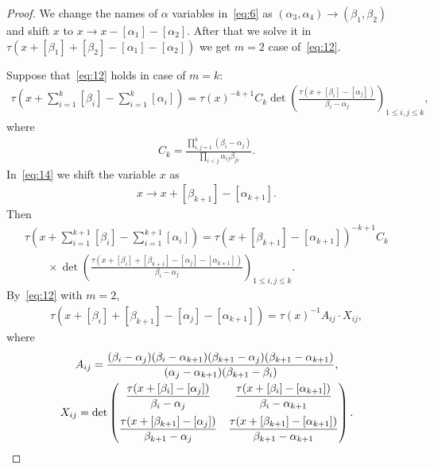 \documentclass[pdftex]{sigma}
\begin{document}
\begin{proof}
We change the names of $\alpha$ variables in~\eqref{eq:6} as
$(\alpha_3,\alpha_4)\rightarrow(\beta_1,\beta_2)$ and shift $x$ to $x\rightarrow x-[\alpha_1]-[\alpha_2]$.
After that we solve it in $\tau(x+[\beta_1]+[\beta_2]-[\alpha_1]-[\alpha_2])$ we get $m=2$ case
of~\eqref{eq:12}.

Suppose that~\eqref{eq:12} holds in case of $m=k$:
\begin{gather}
\tau\left(x+\sum_{i=1}^{k}[\beta_i]-\sum_{i=1}^{k}[\alpha_i]\right)
=\tau(x)^{-k+1}C_k\det\left(\frac{\tau(x+[\beta_i]-[\alpha_j])}{\beta_i-\alpha_j}\right)_{1\le i,j\le k},
\label{eq:14}
\end{gather}
where
\begin{gather*}
C_k=\frac{\prod\limits_{i,j=1}^{k}(\beta_i-\alpha_j)}{\prod\limits_{i<j}\alpha_{ij}\beta_{ji}}.
\end{gather*}
In~\eqref{eq:14} we shift the variable $x$ as
\begin{gather*}
x\rightarrow x+[\beta_{k+1}]-[\alpha_{k+1}].
\end{gather*}
Then
\begin{gather}
\tau\left(x+\sum_{i=1}^{k+1}[\beta_i]-\sum_{i=1}^{k+1}[\alpha_i]\right)
=\tau(x+[\beta_{k+1}]-[\alpha_{k+1}])^{-k+1}C_k
\nonumber\\
\qquad
{}\times
\det\left(\frac{\tau(x+[\beta_i]+[\beta_{k+1}
]-[\alpha_j]-[\alpha_{k+1}])}{\beta_i-\alpha_j}\right)_{1\le i,j\le k}.
\label{eq:15}
\end{gather}
By~\eqref{eq:12} with $m=2$,
\begin{gather}
\tau(x+[\beta_i]+[\beta_{k+1}]-[\alpha_j]-[\alpha_{k+1}])=\tau(x)^{-1}A_{ij}\cdot X_{ij},
\label{eq:16}
\end{gather}
where
\begin{gather*}
A_{ij}=\frac{(\beta_i-\alpha_j)(\beta_i-\alpha_{k+1})(\beta_{k+1}-\alpha_j)(\beta_{k+1}-\alpha_{k+1})}
{(\alpha_j-\alpha_{k+1})(\beta_{k+1}-\beta_i)},
\\
X_{ij}=\det\left(
\begin{matrix}\dfrac{\tau(x+[\beta_i]-[\alpha_j])}{\beta_i-\alpha_j}&\dfrac{\tau(x+[\beta_i]-[\alpha_{k+1}])}
{\beta_i-\alpha_{k+1}}
\vspace{2mm}\\
\dfrac{\tau(x+[\beta_{k+1}]-[\alpha_j])}{\beta_{k+1}-\alpha_j}&\dfrac{\tau(x+[\beta_{k+1}]-[\alpha_{k+1}])}
{\beta_{k+1}-\alpha_{k+1}}
\end{matrix}
\right).
\end{gather*}

\end{proof}
\end{document}
